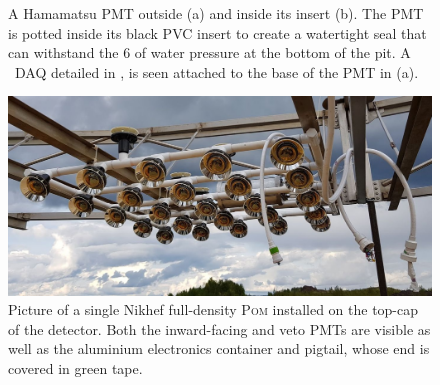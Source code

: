 \begin{figure} %
    \centering
    \quad
    \caption[Pictures of the Madison PMT assembly]
    {A Hamamatsu PMT outside (a) and inside its insert (b). The PMT is potted inside its black PVC
        insert to create a watertight seal that can withstand the \SI{6}{} of water
        pressure at the bottom of the pit. A \si{\micro\nothing}DAQ detailed in , is
        seen attached to the base of the PMT in (a).}
    \label{fig:madison_pmt_assembly}
\end{figure}

\begin{figure} %
    \includegraphics[width=\textwidth]{diagrams/4-chips/single_plane.pdf}
    \caption[Picture of a Nikhef \textsc{Pom}]
    {Picture of a single Nikhef full-density \textsc{Pom} installed on the top-cap of the
        \chipsfive detector. Both the inward-facing and veto PMTs are visible as well as the
        aluminium electronics container and pigtail, whose end is covered in green tape.}
    \label{fig:single_plane}
\end{figure}

